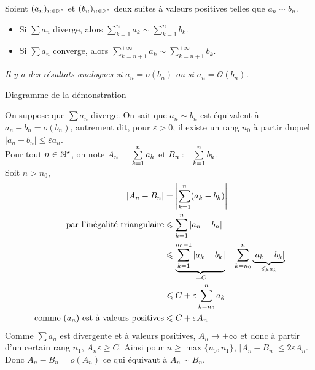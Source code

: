 \begin{prop}{}
    Soient $(a_n)_{n \in \mathbb{N}^\star}$ et $(b_n)_{n \in \mathbb{N}^\star}$ deux suites à valeurs positives telles que $a_n \sim b_n$.
    \begin{itemize}
        \item Si $ \sum a_n$ diverge, alors $\sum\limits_{k=1}^{n} a_k \sim \sum\limits_{k=1}^{n} b_k$. 
        \item Si $ \sum a_n$ converge, alors $\sum\limits_{k=n+1}^{+ \infty} a_k \sim \sum\limits_{k=n+1}^{+ \infty} b_k$. 
    \end{itemize}
\end{prop}

\emph{Il y a des résultats analogues si $a_n = o(b_n)$ ou si $a_n = \mathcal{O}(b_n)$.}

\begin{marginfigure}[3cm]
    \centering
    \caption*{\centering Diagramme de la démonstration}
\end{marginfigure}

\begin{preuve}
    On suppose que $\sum a_n$ diverge. On sait que $a_n \sim b_n$ est équivalent à $a_n -b_n = o(b_n)$, autrement dit, pour $\varepsilon > 0$, il existe un rang $n_0$ à partir duquel $|a_n -b_n| \leqslant \varepsilon a_n$. \\
    Pour tout $n \in \mathbb{N}^\star$, on note $A_n \defeq \sum\limits_{k=1}^n a_k$ et $B_n \defeq \sum\limits_{k=1}^n b_k$. \\
    Soit $n > n_0$,
    \begin{align*}
        |A_n - B_n| &= \left|\sum_{k=1}^n (a_k - b_k) \right| \\
        \text{par l'inégalité triangulaire} &\leqslant \sum_{k=1}^n |a_n-b_n| \\
        &\leqslant \underbrace{\sum_{k=1}^{n_0-1} |a_k - b_k|}_{\defeq C} + \sum_{k=n_0}^n \underbrace{|a_k - b_k|}_{\leqslant \varepsilon a_k} \\
        &\leqslant C + \varepsilon \sum_{k=n_0}^n a_k \\
        \text{comme $(a_n)$ est à valeurs positives} &\leqslant C + \varepsilon A_n
    \end{align*}
    Comme $\sum a_n$ est divergente et à valeurs positives, $A_n \longrightarrow +\infty$ et donc à partir d'un certain rang $n_1$, $A_n \varepsilon \geqslant C$. Ainsi pour $n \geqslant \max \{ n_0, n_1 \}$, $|A_n - B_n| \leqslant 2 \varepsilon A_n$. \\ 
    Donc $A_n - B_n = o(A_n)$ ce qui équivaut à $A_n \sim B_n$.
\end{preuve}

